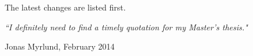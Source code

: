 \documentclass[11pt, a4paper, oneside]{Thesis} %
\begin{document}



\clearpage %


\changelog

The latest changes are listed first.

\begin{description}
  
\end{description}

\clearpage


\pagestyle{empty} %

\null\vfill %

\textit{\Large{``I definitely need to find a timely quotation for my Master's thesis."}}

\begin{flushright}
Jonas Myrlund, February 2014
\end{flushright}

\vfill\vfill\vfill\vfill\vfill\vfill\null %

\clearpage %


\end{document}
